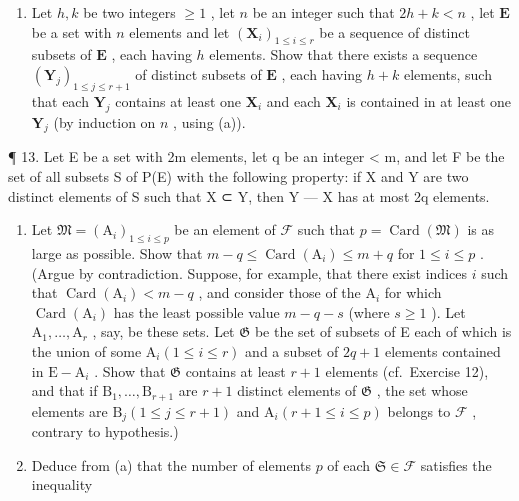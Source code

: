 \begin{enumerate}
\def\labelenumi{(\alph{enumi})}
\setcounter{enumi}{1}
\tightlist
\item
  Let \(h, k\) be two integers \(\geqslant 1\) , let \(n\) be an integer such that \(2h + k < n\) , let \(\mathbf{E}\) be a set with \(n\) elements and let \((\mathbf{X}_i)_{1 \leqslant i \leqslant r}\) be a sequence of distinct subsets of \(\mathbf{E}\) , each having \(h\) elements. Show that there exists a sequence \((\mathbf{Y}_j)_{1 \leqslant j \leqslant r+1}\) of distinct subsets of \(\mathbf{E}\) , each having \(h + k\) elements, such that each \(\mathbf{Y}_j\) contains at least one \(\mathbf{X}_i\) and each \(\mathbf{X}_i\) is contained in at least one \(\mathbf{Y}_j\) (by induction on \(n\) , using (a)).
\end{enumerate}

¶ 13. Let E be a set with 2m elements, let q be an integer \textless{} m, and let F be the set of all subsets S of P(E) with the following property: if X and Y are two distinct elements of S such that X ⊂ Y, then Y --- X has at most 2q elements.

\begin{enumerate}
\def\labelenumi{(\alph{enumi})}
\item
  Let \(\mathfrak{M} = (\mathrm{A}_i)_{1\leqslant i\leqslant p}\) be an element of \(\mathcal{F}\) such that \(p = \operatorname{Card}(\mathfrak{M})\) is as large as possible. Show that \(m - q\leqslant \operatorname{Card}(\mathrm{A}_i)\leqslant m + q\) for \(1\leqslant i\leqslant p\) . (Argue by contradiction. Suppose, for example, that there exist indices \(i\) such that \(\operatorname{Card}(\mathrm{A}_i) < m - q\) , and consider those of the \(\mathrm{A}_i\) for which \(\operatorname{Card}(\mathrm{A}_i)\) has the least possible value \(m - q - s\) (where \(s\geqslant 1\) ). Let \(\mathrm{A}_1,\ldots ,\mathrm{A}_r\) , say, be these sets. Let \(\mathfrak{G}\) be the set of subsets of E each of which is the union of some \(\mathrm{A}_i(1\leqslant i\leqslant r)\) and a subset of \(2q + 1\) elements contained in \(\mathrm{E} - \mathrm{A}_i\) . Show that \(\mathfrak{G}\) contains at least \(r + 1\) elements (cf.~Exercise 12), and that if \(\mathrm{B}_1,\ldots ,\mathrm{B}_{r + 1}\) are \(r + 1\) distinct elements of \(\mathfrak{G}\) , the set whose elements are \(\mathrm{B}_j(1\leqslant j\leqslant r + 1)\) and \(\mathrm{A}_i(r + 1\leqslant i\leqslant p)\) belongs to \(\mathcal{F}\) , contrary to hypothesis.)
\item
  Deduce from (a) that the number of elements \(p\) of each \(\mathfrak{S} \in \mathcal{F}\) satisfies the inequality
\end{enumerate}

